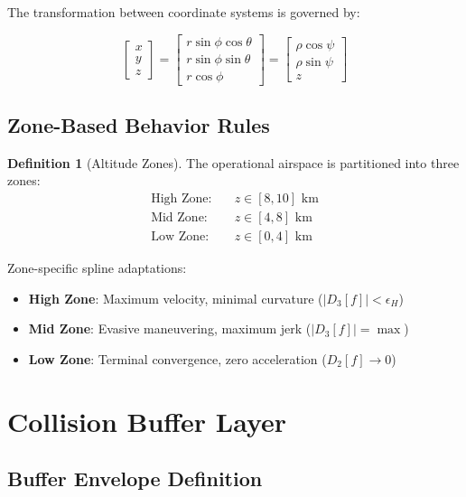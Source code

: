 \documentclass[11pt,a4paper]{article}
\theoremstyle{definition}
\newtheorem{definition}{Definition}[section]
\theoremstyle{plain}
\begin{document}
The transformation between coordinate systems is governed by:

\begin{equation}
\begin{bmatrix}
x \\ y \\ z
\end{bmatrix} = 
\begin{bmatrix}
r\sin\phi\cos\theta \\
r\sin\phi\sin\theta \\
r\cos\phi
\end{bmatrix} = 
\begin{bmatrix}
\rho\cos\psi \\
\rho\sin\psi \\
z
\end{bmatrix}
\end{equation}

\subsection{Zone-Based Behavior Rules}

\begin{definition}[Altitude Zones]
The operational airspace is partitioned into three zones:
\begin{align}
\text{High Zone}: \quad & z \in [8, 10] \text{ km} \\
\text{Mid Zone}: \quad & z \in [4, 8] \text{ km} \\
\text{Low Zone}: \quad & z \in [0, 4] \text{ km}
\end{align}
\end{definition}

Zone-specific spline adaptations:
\begin{itemize}
    \item \textbf{High Zone}: Maximum velocity, minimal curvature ($|D_3[f]| < \epsilon_H$)
    \item \textbf{Mid Zone}: Evasive maneuvering, maximum jerk ($|D_3[f]| = \max$)
    \item \textbf{Low Zone}: Terminal convergence, zero acceleration ($D_2[f] \rightarrow 0$)
\end{itemize}

\section{Collision Buffer Layer}

\subsection{Buffer Envelope Definition}
\end{document}
